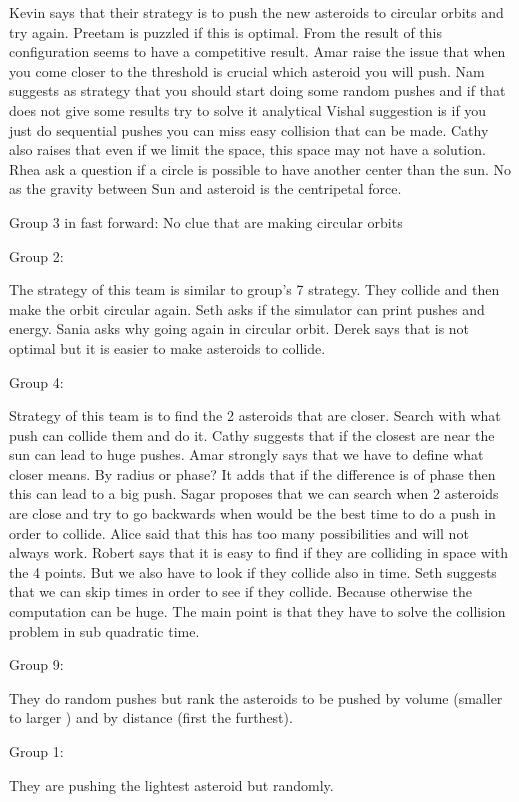 Kevin says that their strategy is to push the new asteroids to circular orbits and try again.
Preetam is puzzled if this is optimal.
From the result of this configuration seems to have a competitive result.
Amar raise the issue that when you come closer to the threshold is crucial which asteroid you will push.
Nam suggests as strategy that you should start doing some random pushes and if that does not give some results try to solve it analytical
Vishal suggestion is if you just do sequential pushes you can miss easy collision that can be made.
Cathy also raises that even if we limit the space, this space may not have a solution.
Rhea ask a question if a circle is possible to have another center than the sun. No as the gravity between Sun and asteroid is the centripetal force. 

Group 3 in fast forward:
No clue that are making circular orbits

Group 2:

The strategy of this team is similar to group’s 7 strategy. They collide and then 
make the orbit circular again.
Seth asks if the simulator can print pushes and energy.
Sania asks why going again in circular orbit.
Derek says that is not optimal but it is easier to make asteroids to collide.

Group 4:

Strategy of this team is to find the 2 asteroids that are closer. Search with what push can collide them and do it. 
Cathy suggests that if the closest are near the sun can lead to huge pushes.
Amar strongly says that we have to define what closer means. By radius or phase?
It adds that if the difference is of phase then this can lead to a big push.
Sagar proposes that we can search when 2 asteroids are close and try to go backwards when would be the best time to do a push in order to collide.
Alice said that this has too many possibilities and will not always work.
Robert says that it is easy to find if they are colliding in space with the 4 points. But we also have to look if they collide also in time.
Seth suggests that we can skip times in order to see if they collide. Because 
otherwise the computation can be huge.
The main point is that they have to solve the collision problem in sub quadratic time.


Group 9:

They do random pushes but rank the asteroids to be pushed by volume (smaller to larger ) and by distance (first the furthest).

Group 1:

They are pushing the lightest asteroid but randomly. 

